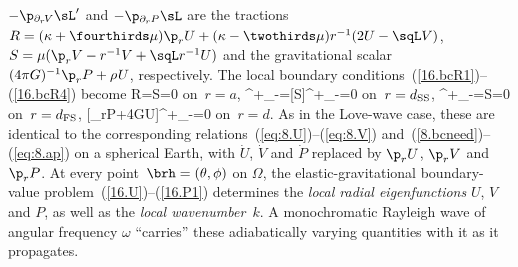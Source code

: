 $-\p_{\raisebox{0.5 ex}{$\scriptstyle\partial_r\hspace{-0.3 mm}V$}}\sL'$ and
$-\p_{\raisebox{0.5 ex}{$\scriptstyle\partial_r\hspace{-0.1 mm}P$}}\sL$
are the tractions $R=(\kappa+\fourthirds\mu)\p_rU
+(\kappa-\twothirds\mu)r^{-1}(2U-\sqL V)$,
$S=\mu(\p_rV-r^{-1}V+\sqL r^{-1}U)$ and
the gravitational scalar $(4\pi G)^{-1}\p_rP+\rho\hspace{0.2 mm}U$,
respectively. The local boundary
conditions~(\ref{16.bcR1})--(\ref{16.bcR4})
become
\eq \label{16.RS1}
R=S=0
\quad\mbox{on $r=a$},
\en
\eq
[R]^+_-=[S]^+_-=0
\quad\mbox{on $r=d_{\rm SS}$},
\en
\eq
[R]^+_-=S=0
\quad\mbox{on $r=d_{\rm FS}$},
\en
\eq \label{16.P1}
[\p_rP+4\pi G\rho\hspace{0.2 mm}U]^+_-=0
\quad\mbox{on $r=d$}.
\en
As in the Love-wave case, these are identical to
the corresponding relations~(\ref{eq:8.U})--(\ref{eq:8.V})
and~(\ref{8.bcneed})--(\ref{eq:8.ap}) on a spherical
Earth, with $\dot{U}$, $\dot{V}$ and $\dot{P}$
replaced by $\p_rU$, $\p_rV$ and $\p_rP$.
At every point~$\brh=(\theta,\phi)$
on $\Omega$, the elastic-gravitational
boundary-value problem~(\ref{16.U})--(\ref{16.P1})
determines the {\em local radial eigenfunctions\/}
%
%
%
%
$U$, $V$ and $P$, as well as the {\em local
wavenumber\/}~$k$.  A monochromatic Rayleigh wave
of angular frequency $\omega$ ``carries'' these
adiabatically varying quantities with it as it
%
propagates.

